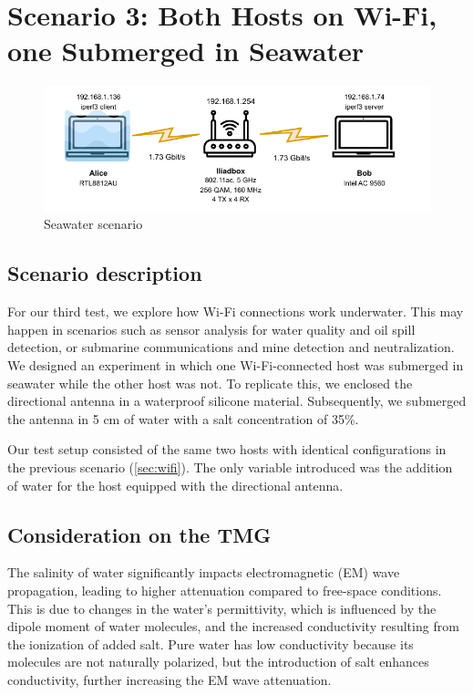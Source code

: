 \section{Scenario 3: Both Hosts on Wi-Fi, one Submerged in Seawater}

\label{sec:wifi_water}
\begin{figure}[h]
    \centering
    \includegraphics[width=0.95\linewidth]{images/wifi_water.drawio.pdf}
    \caption{Seawater scenario}
    \label{fig:wifi_to_wifi_water_pic}
\end{figure}

\subsection{Scenario description}
For our third test, we explore how Wi-Fi connections work underwater. This may happen in scenarios such as sensor analysis for water quality and oil spill detection, or submarine communications and mine detection and neutralization. We designed an experiment in which one Wi-Fi-connected host was submerged in seawater while the other host was not.
To replicate this, we enclosed the directional antenna in a waterproof silicone material. Subsequently, we submerged the antenna in 5 cm of water with a salt concentration of 35\%.

Our test setup consisted of the same two hosts with identical configurations in the previous scenario (\ref{sec:wifi}). The only variable introduced was the addition of water for the host equipped with the directional antenna.

\subsection{Consideration on the TMG}
The salinity of water significantly impacts electromagnetic (EM) wave propagation, leading to higher attenuation compared to free-space conditions. This is due to changes in the water's permittivity, which is influenced by the dipole moment of water molecules, and the increased conductivity resulting from the ionization of added salt. Pure water has low conductivity because its molecules are not naturally polarized, but the introduction of salt enhances conductivity, further increasing the EM wave attenuation.

